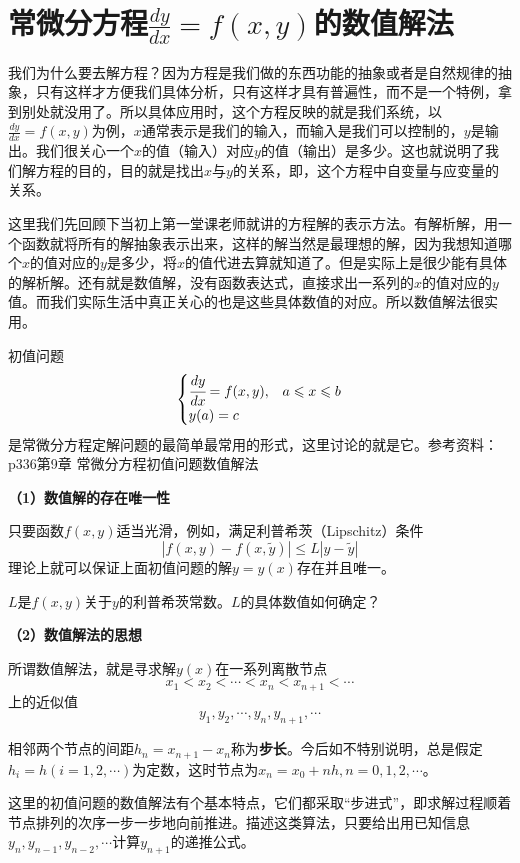 \chapter{常微分方程$\frac{dy}{dx}=f(x,y)$的数值解法}
我们为什么要去解方程？因为方程是我们做的东西功能的抽象或者是自然规律的抽象，只有这样才方便我们具体分析，只有这样才具有普遍性，而不是一个特例，拿到别处就没用了。所以具体应用时，这个方程反映的就是我们系统，以$\frac{dy}{dx}=f(x,y)$为例，$x$通常表示是我们的输入，而输入是我们可以控制的，$y$是输出。我们很关心一个$x$的值（输入）对应$y$的值（输出）是多少。这也就说明了我们解方程的目的，目的就是找出$x$与$y$的关系，即，这个方程中自变量与应变量的关系。

这里我们先回顾下当初上第一堂课老师就讲的方程解的表示方法。有解析解，用一个函数就将所有的解抽象表示出来，这样的解当然是最理想的解，因为我想知道哪个$x$的值对应的$y$是多少，将$x$的值代进去算就知道了。但是实际上是很少能有具体的解析解。还有就是数值解，没有函数表达式，直接求出一系列的$x$的值对应的$y$值。而我们实际生活中真正关心的也是这些具体数值的对应。所以数值解法很实用。

初值问题
$$\begin{cases}\cfrac{dy}{dx}=f(x,y),&a\le x\le b\\ y(a)=c &\end{cases}$$
是常微分方程定解问题的最简单最常用的形式，这里讨论的就是它。参考资料：\cite{数值分析}p336第9章 常微分方程初值问题数值解法

\textbf{（1）数值解的存在唯一性}

只要函数$f(x,y)$适当光滑，例如，满足利普希茨（Lipschitz）条件
$$|f(x,y)-f(x,\tilde{y})|\le L|y-\tilde{y}|$$
理论上就可以保证上面初值问题的解$y=y(x)$存在并且唯一。

$L$是$f(x,y)$关于$y$的利普希茨常数。$L$的具体数值如何确定？

\textbf{（2）数值解法的思想}

所谓数值解法，就是寻求解$y(x)$在一系列离散节点
$$x_1<x_2<\cdots <x_n <x_{n+1}<\cdots$$
上的近似值
$$y_1,y_2,\cdots,y_n,y_{n+1},\cdots$$

相邻两个节点的间距$h_n=x_{n+1}-x_n$称为\textbf{步长}。今后如不特别说明，总是假定$h_i=h(i=1,2,\cdots)$为定数，这时节点为$x_n=x_0+nh,n=0,1,2,\cdots$。

这里的初值问题的数值解法有个基本特点，它们都采取“步进式”，即求解过程顺着节点排列的次序一步一步地向前推进。描述这类算法，只要给出用已知信息$y_n,y_{n-1},y_{n-2},\cdots$计算$y_{n+1}$的递推公式。

